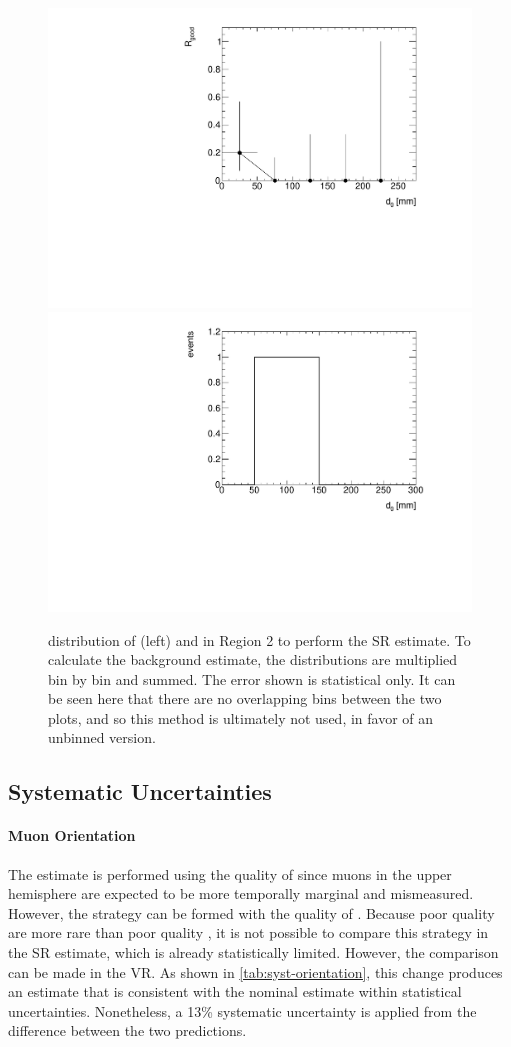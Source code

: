 \begin{figure}[htbp]
\centering
\includegraphics[width=.48\textwidth]{figures/cosmics/d0_SR_v4_rgood.pdf}
\includegraphics[width=.48\textwidth]{figures/cosmics/d0_SR_v4_2mu.pdf}
\caption{\absdz distribution of \rgood (left) and \mt in Region 2 to perform the SR estimate. To calculate the background estimate, the distributions are multiplied bin by bin and summed. The error shown is statistical only. It can be seen here that there are no overlapping bins between the two plots, and so this method is ultimately not used, in favor of an unbinned version.}
\label{fig:SR-rgood}
\end{figure}

\subsection{\label{sec:cos_syst}Systematic Uncertainties}

\paragraph{Muon Orientation}

The estimate is performed using the quality of \mt since muons in the upper hemisphere are expected to be more temporally marginal and mismeasured. However, the strategy can be formed with the quality of \mb. Because poor quality \mb are more rare than poor quality \mt, it is not possible to compare this strategy in the SR estimate, which is already statistically limited. However, the comparison can be made in the VR. As shown in \autoref{tab:syst-orientation}, this change produces an estimate that is consistent with the nominal estimate within statistical uncertainties. Nonetheless, a 13\% systematic uncertainty is applied from the difference between the two predictions.

